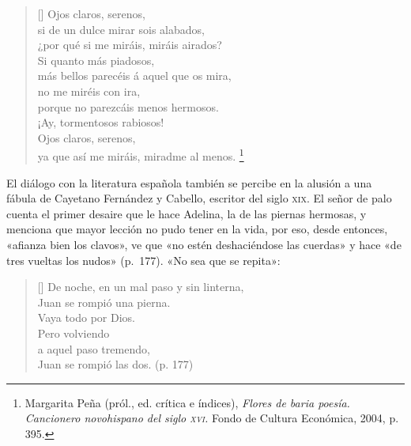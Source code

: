 \documentclass[14pt,twoside,final]{extbook} %
\let\oldfootnote\footnote
\renewcommand\footnote[1]{%
\oldfootnote{\hspace{1mm}#1}}
\begin{document}
\begin{verse}[\versewidth]
Ojos claros, serenos, \\
si de un dulce mirar sois alabados, \\
¿por qué si me miráis, miráis airados? \\
Si quanto más piadosos, \\
más bellos parecéis á aquel que os mira, \\
no me miréis con ira, \\
porque no parezcáis menos hermosos. \\
¡Ay, tormentosos rabiosos! \\
Ojos claros, serenos, \\
ya que así me miráis, miradme al menos.\footnote{Margarita Peña (pról., ed. crítica e índices), \emph{Flores de baria poesía. Cancionero novohispano del siglo \textsc{xvi}.} Fondo de Cultura Económica, 2004, p. 395.}
\end{verse}
El diálogo con la literatura española también se percibe en la alusión a una fábula de Cayetano Fernández y Cabello, escritor del siglo \textsc{xix}. El señor de palo cuenta el primer desaire que le hace Adelina, la de las piernas hermosas, y menciona que mayor lección no pudo tener en la vida, por eso, desde entonces, «afianza bien los clavos», ve que «no estén deshaciéndose las cuerdas» y hace «de tres vueltas los nudos» (p.~177). «No sea que se repita»:\pagebreak[4]
\settowidth{\versewidth}{De noche, en un mal paso y sin linterna,}
\begin{verse}[\versewidth]
De noche, en un mal paso y sin linterna, \\
Juan se rompió una pierna. \\
Vaya todo por Dios. \\
Pero volviendo \\
a aquel paso tremendo, \\
Juan se rompió las dos. (p. 177)
\end{verse}
\end{document}
